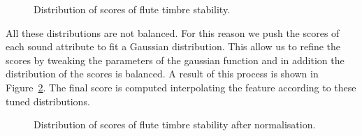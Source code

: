 \documentclass{article}
\begin{document}
\begin{figure}[ht]
 \centerline{}
 \caption{Distribution of scores of flute timbre stability.}
 \label{fig:scores}
\end{figure}

All these distributions are not balanced. For this reason we push the scores of each sound attribute to fit a Gaussian distribution. This allow us to refine the scores by tweaking the parameters of the gaussian function and in addition the distribution of the scores is balanced.
A result of this process is shown in Figure~\ref{fig:scores_2}. The final score is computed interpolating the feature according to these tuned distributions. 

\begin{figure}[ht]
 \centerline{}
 \caption{Distribution of scores of flute timbre stability after normalisation.}
 \label{fig:scores_2}
\end{figure}
\end{document}
